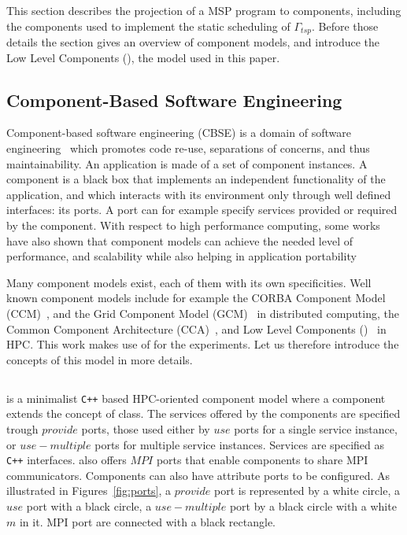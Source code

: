 This section describes the projection of a MSP program to components, including the components used to implement the static scheduling of $\Gamma_{tsp}$.
Before those details the section gives an overview of component models, and introduce the Low Level Components (\llc), the model used in this paper.


\subsection{Component-Based Software Engineering}
Component-based software engineering (CBSE) is a domain of software engineering~\cite{Szyperski:2002:CSB:515228} which promotes code
re-use, separations of concerns, and thus maintainability.
An application is made of a set of component instances.
A component is a black box that implements an independent functionality of the application, and which interacts with its environment only through well defined interfaces: its ports.
A port can for example specify services provided or required by the component.
With respect to high performance computing, some works have also shown
that component models can achieve the needed level of performance, and
scalability while also helping in application
portability~\cite{Bernholdt01052006, bigot:inria-00388508, UCHPC2015}

Many component models exist, each of them with its own specificities.
Well known component models include for example the CORBA Component Model (CCM)~\cite{corba:omg06}, and the Grid Component Model (GCM)~\cite{Baude} in distributed computing, the Common Component Architecture (CCA)~\cite{Bernholdt01052006}, and Low Level Components (\llc)~\cite{l2c} in HPC.
This work makes use of \llc for the experiments.
Let us therefore introduce the concepts of this model in more details.

\subsection{\llc}

\llc is a minimalist \texttt{C++} based HPC-oriented component model
where a component extends the concept of class.
The services offered by the components are specified trough $provide$ ports,
those used either by $use$ ports for a single service instance,
or $use-multiple$ ports for multiple service instances.
Services are specified as \texttt{C++} interfaces.
\llc also offers $MPI$ ports that enable components to share MPI communicators.
Components can also have attribute ports to be configured.
%
As illustrated in Figures~\ref{fig:ports}, a $provide$ port is
represented by a white circle, a $use$
port with a black circle, a $use-multiple$ port by a black circle with
a white $m$ in it. MPI port are
connected with a black rectangle.

